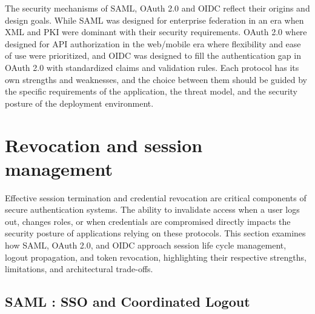 \documentclass[../memoire.tex]{subfiles}
\begin{document}
The security mechanisms of SAML, OAuth 2.0 and OIDC reflect their origins and design goals. While SAML was designed for enterprise federation in an era when XML and PKI were dominant with their security requirements. OAuth 2.0 where designed for API authorization in the web/mobile era where flexibility and ease of use were prioritized, and OIDC was designed to fill the authentication gap in OAuth 2.0 with standardized claims and validation rules. Each protocol has its own strengths and weaknesses, and the choice between them should be guided by the specific requirements of the application, the threat model, and the security posture of the deployment environment.

\section{Revocation and session management}


Effective session termination and credential revocation are critical components of secure authentication systems. The ability to invalidate access when a user logs out, changes roles, or when credentials are compromised directly impacts the security posture of applications relying on these protocols. This section examines how SAML, OAuth 2.0, and OIDC approach session life cycle management, logout propagation, and token revocation, highlighting their respective strengths, limitations, and architectural trade-offs.

\subsection{SAML : SSO and Coordinated Logout}

\end{document}
